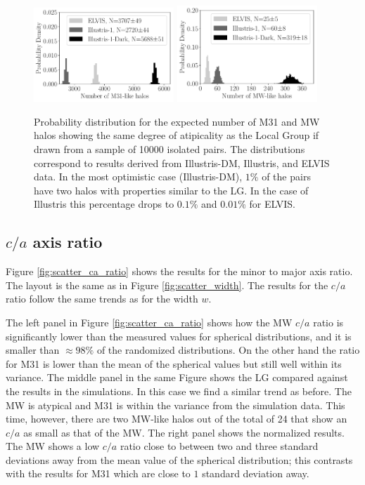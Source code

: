 \documentclass[a4paper,fleqn,usenatbib]{mnras}
\begin{document}
\begin{figure}
\centering
\includegraphics[width=0.47\textwidth]{expected_numbers_n_M31.pdf}
\includegraphics[width=0.47\textwidth]{expected_numbers_n_MW.pdf}
\caption{Probability distribution for the expected number of M31 and
  MW halos showing the same degree of atipicality as the Local Group if drawn
  from a sample of 10000 isolated pairs. 
  The distributions correspond to results derived from Illustris-DM, Illustris,
  and ELVIS data.
  In the most optimistic case (Illustris-DM), $1\%$ of the pairs have
  two halos with properties similar to the LG. In the case of
  Illustris this percentage drops to $0.1\%$ and $0.01\%$ for ELVIS.
\label{fig:expected_number}}
\end{figure}

\subsection{$c/a$ axis ratio}

Figure \ref{fig:scatter_ca_ratio} shows the results for the minor to
major axis ratio. 
The layout is the same as in Figure \ref{fig:scatter_width}.
The results for the $c/a$ ratio follow the same trends as for the
width $w$.

The left panel in Figure \ref{fig:scatter_ca_ratio} shows how the MW
$c/a$ ratio is significantly lower than the measured values for
spherical distributions, and it is smaller than $\approx 98\%$ of the
randomized distributions.   
On the other hand the ratio for M31 is lower than the mean of the
spherical values but still well within its variance.
The middle panel in the same Figure shows the LG compared against the
results in the simulations. 
In this case we find a similar trend as before. 
The MW is atypical and M31 is within the variance from the simulation data.
This time, however, there are two MW-like halos out of the total
of 24 that show an $c/a$ as small as that of the MW.
The right panel shows the normalized results. 
The MW shows a low $c/a$ ratio close to between two and three
standard deviations away from the mean value of the spherical
distribution; this contrasts with the results for M31 which are close to
$1$ standard deviation away. 
\end{document}
